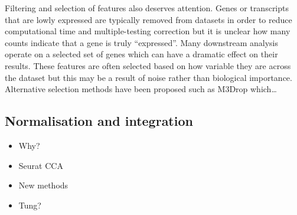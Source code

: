 \documentclass[11pt,a4paper,titlepage,twoside,openright]{style/unimelbthesis}
\theoremstyle{definition}
\theoremstyle{definition}
\theoremstyle{definition}
\theoremstyle{remark}
\begin{document}
\begin{mainmatter}
Filtering and selection of features also deserves attention. Genes or transcripts that are lowly expressed are typically removed from datasets in order to reduce computational time and multiple-testing correction but it is unclear how many counts indicate that a gene is truly ``expressed''. Many downstream analysis operate on a selected set of genes which can have a dramatic effect on their results. These features are often selected based on how variable they are across the dataset but this may be a result of noise rather than biological importance. Alternative selection methods have been proposed such as M3Drop which\ldots{}

\hypertarget{normalisation-and-integration}{%
\subsection{Normalisation and integration}\label{normalisation-and-integration}}

\begin{itemize}
\tightlist
\item
  Why?
\item
  Seurat CCA
\item
  New methods
\item
  Tung?
\end{itemize}


\end{mainmatter}
\end{document}
